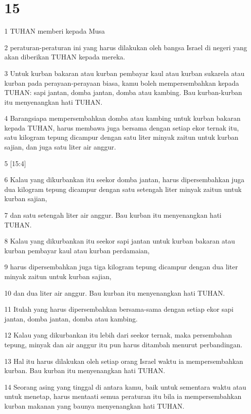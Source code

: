 \chapter{15}

\par 1 TUHAN memberi kepada Musa
\par 2 peraturan-peraturan ini yang harus dilakukan oleh bangsa Israel di negeri yang akan diberikan TUHAN kepada mereka.
\par 3 Untuk kurban bakaran atau kurban pembayar kaul atau kurban sukarela atau kurban pada perayaan-perayaan biasa, kamu boleh mempersembahkan kepada TUHAN: sapi jantan, domba jantan, domba atau kambing. Bau kurban-kurban itu menyenangkan hati TUHAN.
\par 4 Barangsiapa mempersembahkan domba atau kambing untuk kurban bakaran kepada TUHAN, harus membawa juga bersama dengan setiap ekor ternak itu, satu kilogram tepung dicampur dengan satu liter minyak zaitun untuk kurban sajian, dan juga satu liter air anggur.
\par 5 [15:4]
\par 6 Kalau yang dikurbankan itu seekor domba jantan, harus dipersembahkan juga dua kilogram tepung dicampur dengan satu setengah liter minyak zaitun untuk kurban sajian,
\par 7 dan satu setengah liter air anggur. Bau kurban itu menyenangkan hati TUHAN.
\par 8 Kalau yang dikurbankan itu seekor sapi jantan untuk kurban bakaran atau kurban pembayar kaul atau kurban perdamaian,
\par 9 harus dipersembahkan juga tiga kilogram tepung dicampur dengan dua liter minyak zaitun untuk kurban sajian,
\par 10 dan dua liter air anggur. Bau kurban itu menyenangkan hati TUHAN.
\par 11 Itulah yang harus dipersembahkan bersama-sama dengan setiap ekor sapi jantan, domba jantan, domba atau kambing.
\par 12 Kalau yang dikurbankan itu lebih dari seekor ternak, maka persembahan tepung, minyak dan air anggur itu pun harus ditambah menurut perbandingan.
\par 13 Hal itu harus dilakukan oleh setiap orang Israel waktu ia mempersembahkan kurban. Bau kurban itu menyenangkan hati TUHAN.
\par 14 Seorang asing yang tinggal di antara kamu, baik untuk sementara waktu atau untuk menetap, harus mentaati semua peraturan itu bila ia mempersembahkan kurban makanan yang baunya menyenangkan hati TUHAN.

